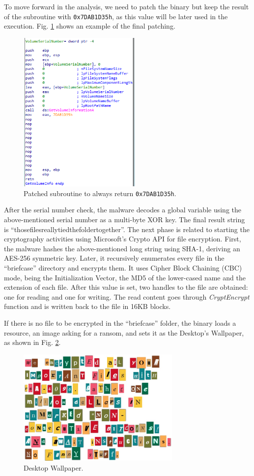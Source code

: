 To move forward in the analysis, we need to patch the binary but keep the result of the subroutine with \texttt{0x7DAB1D35h}, as this value will be later used in the execution. Fig. \ref{fig:ida_4} shows an example of the final patching.

\begin{figure}[H]
    \includegraphics[width=6cm]{figures/ida_4.png}
    \caption{Patched subroutine to always return \texttt{0x7DAB1D35h}.}
    \label{fig:ida_4}
\end{figure}

After the serial number check, the malware decodes a global variable using the above-mentioned serial number as a multi-byte XOR key. The final result string is ``thosefilesreallytiedthefoldertogether''. The next phase is related to starting the cryptography activities using Microsoft's Crypto API for file encryption. First, the malware hashes the above-mentioned long string using SHA-1, deriving an AES-256 symmetric key. Later, it recursively enumerates every file in the ``briefcase'' directory and encrypts them. It uses Cipher Block Chaining (CBC) mode, being the Initialization Vector, the MD5 of the lower-cased name and the extension of each file. After this value is set, two handles to the file are obtained: one for reading and one for writing. The read content goes through \textit{CryptEncrypt} function and is written back to the file in 16KB blocks.

If there is no file to be encrypted in the ``briefcase'' folder, the binary loads a resource, an image asking for a ransom, and sets it as the Desktop's Wallpaper, as shown in Fig. \ref{fig:ida_5}.

\begin{figure}[H]
    \includegraphics[width=8cm]{figures/ida_5.png}
    \caption{Desktop Wallpaper.}
    \label{fig:ida_5}
\end{figure}

